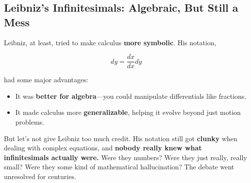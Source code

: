 \subsection{Leibniz’s Infinitesimals: Algebraic, But Still a Mess}  

Leibniz, at least, tried to make calculus \textbf{more symbolic}. His notation,  

\[
dy = \frac{dx}{dx} dy
\]

had some major advantages:

\begin{itemize}
    \item It was \textbf{better for algebra}—you could manipulate differentials like fractions.
    \item It made calculus more \textbf{generalizable}, helping it evolve beyond just motion problems.
\end{itemize}

But let’s not give Leibniz too much credit. His notation still got \textbf{clunky} when dealing with complex equations, and \textbf{nobody really knew what infinitesimals actually were.} Were they numbers? Were they just really, really small? Were they some kind of mathematical hallucination? The debate went unresolved for centuries.
